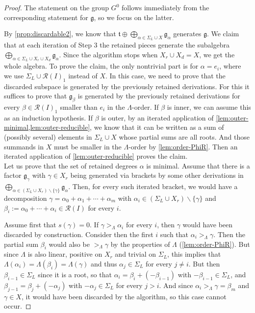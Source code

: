 \documentclass[11pt,letterpaper,reqno]{amsart}
\theoremstyle{remark}
\theoremstyle{definition}
\newcommand{\R}{\mathcal R}
\begin{document}
\begin{proof}
The statement on the group $G^0$ follows immediately from the corresponding statement for $\mathfrak g$, so we focus on the latter.

By \cref{prop:discardable2}, we know that $\mathfrak t\oplus\bigoplus_{\alpha\in \Sigma_L\cup X} \mathfrak g_\alpha$ generates $\mathfrak g$. We claim that at each iteration of Step 3 the retained pieces generate the subalgebra $\bigoplus_{\alpha\in \Sigma_L\cup X_r\cup X_d} \mathfrak g_\alpha$. Since the algorithm stops when $X_r\cup X_d=X$, we get the whole algebra. To prove the claim, the only nontrivial part is for $\alpha=e_i$, where we use $\Sigma_L\cup\mathcal R(I)_1$ instead of $X$. In this case, we need to prove that the discarded subspace is generated by the previously retained derivations. For this it suffices to prove that $\mathfrak g_{\beta}$ is generated by the previously retained derivations for every $\beta\in\mathcal R(I)_1$ smaller than $e_i$ in the $\Lambda$-order. If $\beta$ is inner, we can assume this as an induction hypothesis. If $\beta$ is outer, by an iterated application of \cref{lem:outer-minimal,lem:outer-reducible}, we know that it can be written as a sum of (possibly several) elements in $\Sigma_L\cup X$ whose partial sums are all roots. And those summands in $X$ must be smaller in the $\Lambda$-order by \cref{lem:order-PhiR}. Then an iterated application of \cref{lem:outer-reducible} proves the claim.\\

Let us prove that the set of retained degrees $\alpha$ is minimal. Assume that there is a factor $\mathfrak g_\gamma$ with $\gamma\in X_r$ being generated via brackets by some other derivations in $\bigoplus_{\alpha\in (\Sigma_L\cup X_r)\smallsetminus\{\gamma\}} \mathfrak g_\alpha$. Then, for every such iterated bracket, we would have a decomposition $\gamma=\alpha_0+\alpha_1+\cdots+\alpha_m$ with $\alpha_i\in(\Sigma_L\cup X_r)\smallsetminus\{\gamma\}$ and $\beta_i:=\alpha_0+\cdots+\alpha_i\in\R(I)$ for every $i$. 

Assume first that $s(\gamma)=0$. If $\gamma>_\Lambda\alpha_i$ for every $i$, then $\gamma$ would have been discarded by construction. Consider then the first $i$ such that $\alpha_i>_\Lambda\gamma$. Then the partial sum $\beta_i$ would also be $>_\Lambda\gamma$ by the properties of $\Lambda$ (\cref{lem:order-PhiR}). But since $\Lambda$ is also linear, positive on $X_r$ and trivial on $\Sigma_L$, this implies that $\Lambda(\alpha_i)=\Lambda(\beta_i)=\Lambda(\gamma)$ and thus $\alpha_j\in\Sigma_L$ for every $j\neq i$. But then $\beta_{i-1}\in\Sigma_L$ since it is a root, so that $\alpha_i=\beta_i+(-\beta_{i-1})$ with $-\beta_{i-1}\in\Sigma_L$, and $\beta_{j-1}=\beta_j+(-\alpha_j)$ with $-\alpha_j\in\Sigma_L$ for every $j>i$. And since $\alpha_i>_\Lambda\gamma=\beta_m$ and $\gamma\in X$, it would have been discarded by the algorithm, so this case cannot occur.


\end{proof}
\end{document}
